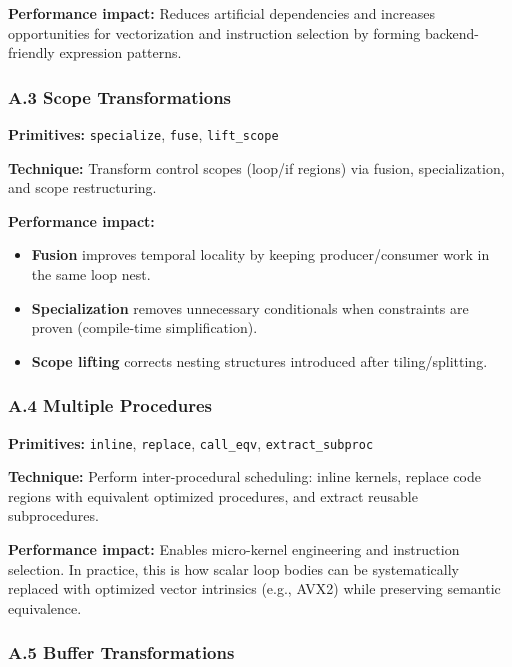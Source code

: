 \textbf{Performance impact:} Reduces artificial dependencies and increases opportunities for vectorization and instruction selection by forming backend-friendly expression patterns.

\hypertarget{a.3-scope-transformations}{%
\subsubsection{A.3 Scope Transformations}\label{a.3-scope-transformations}}

\textbf{Primitives:} \texttt{specialize}, \texttt{fuse}, \texttt{lift\_scope}

\textbf{Technique:} Transform control scopes (loop/if regions) via fusion, specialization, and scope restructuring.

\textbf{Performance impact:}
\begin{itemize}
  \item \textbf{Fusion} improves temporal locality by keeping producer/consumer work in the same loop nest.
  \item \textbf{Specialization} removes unnecessary conditionals when constraints are proven (compile-time simplification).
  \item \textbf{Scope lifting} corrects nesting structures introduced after tiling/splitting.
\end{itemize}

\hypertarget{a.4-multiple-procedures}{%
\subsubsection{A.4 Multiple Procedures}\label{a.4-multiple-procedures}}

\textbf{Primitives:} \texttt{inline}, \texttt{replace}, \texttt{call\_eqv}, \texttt{extract\_subproc}

\textbf{Technique:} Perform inter-procedural scheduling: inline kernels, replace code regions with equivalent optimized procedures, and extract reusable subprocedures.

\textbf{Performance impact:} Enables micro-kernel engineering and instruction selection. In practice, this is how scalar loop bodies can be systematically replaced with optimized vector intrinsics (e.g., AVX2) while preserving semantic equivalence.

\hypertarget{a.5-buffer-transformations}{%
\subsubsection{A.5 Buffer Transformations}\label{a.5-buffer-transformations}}

